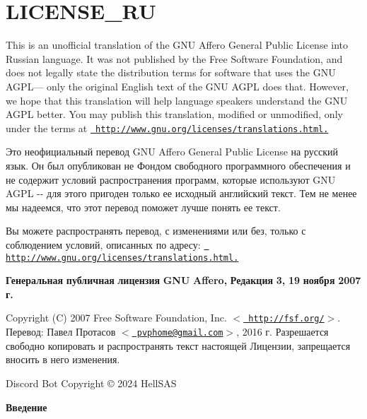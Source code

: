 \chapter{LICENSE\+\_\+\+RU}
\hypertarget{md__c_1_2_users_2_ponom_2_one_drive_2_desktop_2_laidfinland_2_laidinen-_bot_2_l_i_c_e_n_s_e___r_u}{}\label{md__c_1_2_users_2_ponom_2_one_drive_2_desktop_2_laidfinland_2_laidinen-_bot_2_l_i_c_e_n_s_e___r_u}
This is an unofficial translation of the GNU Affero General Public License into Russian language. It was not published by the Free Software Foundation, and does not legally state the distribution terms for software that uses the GNU AGPL--- only the original English text of the GNU AGPL does that. However, we hope that this translation will help language speakers understand the GNU AGPL better. You may publish this translation, modified or unmodified, only under the terms at \href{http://www.gnu.org/licenses/translations.html}{\texttt{ http\+://www.\+gnu.\+org/licenses/translations.\+html.}}

Это неофициальный перевод GNU Affero General Public License на русский язык. Он был опубликован не Фондом свободного программного обеспечения и не содержит условий распространения программ, которые используют GNU AGPL -\/-\/ для этого пригоден только ее исходный английский текст. Тем не менее мы надеемся, что этот перевод поможет лучше понять ее текст.

Вы можете распространять перевод, с изменениями или без, только с соблюдением условий, описанных по адресу\+: \href{http://www.gnu.org/licenses/translations.html}{\texttt{ http\+://www.\+gnu.\+org/licenses/translations.\+html.}}

{\bfseries{Генеральная}} {\bfseries{публичная}} {\bfseries{лицензия}} {\bfseries{GNU}} {\bfseries{Affero,}} {\bfseries{Редакция}} {\bfseries{3,}} {\bfseries{19}} {\bfseries{ноября}} {\bfseries{2007}} {\bfseries{г.}}

Copyright (C) 2007 Free Software Foundation, Inc. \texorpdfstring{$<$}{<}\href{http://fsf.org/}{\texttt{ http\+://fsf.\+org/}}\texorpdfstring{$>$}{>}. Перевод\+: Павел Протасов \texorpdfstring{$<$}{<}\href{mailto:pvphome@gmail.com}{\texttt{ pvphome@gmail.\+com}}\texorpdfstring{$>$}{>}, 2016 г. Разрешается свободно копировать и распространять текст настоящей Лицензии, запрещается вносить в него изменения.

 Discord Bot Copyright © 2024 Hell\+SAS

{\bfseries{Введение}}

